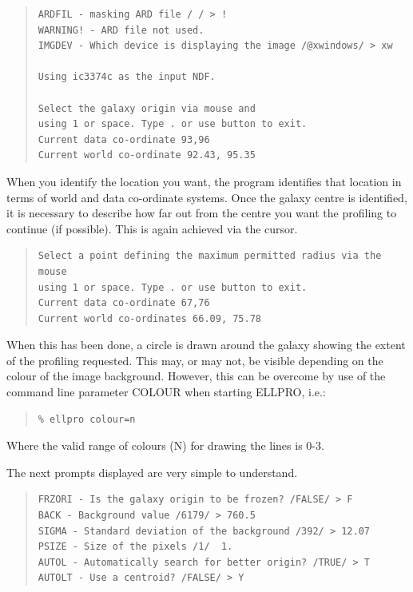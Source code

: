 \documentclass[twoside,11pt]{article}
\newenvironment{myquote}{\begin{quote}\begin{small}}{\end{small}\end{quote}}
\begin{document}
\begin{myquote}
\begin{verbatim}
ARDFIL - masking ARD file / / > !
WARNING! - ARD file not used.
IMGDEV - Which device is displaying the image /@xwindows/ > xw

Using ic3374c as the input NDF.

Select the galaxy origin via mouse and
using 1 or space. Type . or use button to exit.
Current data co-ordinate 93,96
Current world co-ordinate 92.43, 95.35
\end{verbatim}
\end{myquote}

When you identify the location you want, the program identifies that location in
terms of world and data co-ordinate systems.
Once the galaxy centre is identified, it is necessary to describe how far out
from the centre you want the profiling to continue (if possible). This is again
achieved via the cursor. 
                                      
\begin{myquote}
\begin{verbatim}
Select a point defining the maximum permitted radius via the mouse
using 1 or space. Type . or use button to exit.
Current data co-ordinate 67,76
Current world co-ordinates 66.09, 75.78
\end{verbatim}
\end{myquote}

When this has been done, a circle is drawn around the galaxy showing the extent
of the profiling requested. This may, or may not, be visible depending on the
colour of the image background. However, this can be overcome by use of the 
command line parameter COLOUR when starting ELLPRO, i.e.:

\begin{myquote}
\begin{verbatim}
% ellpro colour=n
\end{verbatim}
\end{myquote}

Where the valid range of colours (N) for drawing the lines is 0-3.

The next prompts displayed are very simple to understand.

\begin{myquote}
\begin{verbatim}
FRZORI - Is the galaxy origin to be frozen? /FALSE/ > F
BACK - Background value /6179/ > 760.5
SIGMA - Standard deviation of the background /392/ > 12.07
PSIZE - Size of the pixels /1/  1.
AUTOL - Automatically search for better origin? /TRUE/ > T 
AUTOLT - Use a centroid? /FALSE/ > Y
\end{verbatim}
\end{myquote}
\end{document}
